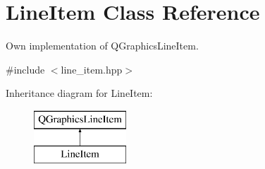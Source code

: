 \hypertarget{classLineItem}{}\section{Line\+Item Class Reference}
\label{classLineItem}


Own implementation of Q\+Graphics\+Line\+Item.  




{\ttfamily \#include $<$line\+\_\+item.\+hpp$>$}

Inheritance diagram for Line\+Item\+:\begin{figure}[H]
\begin{center}
\leavevmode
\includegraphics[height=2.000000cm]{classLineItem}
\end{center}
\end{figure}
